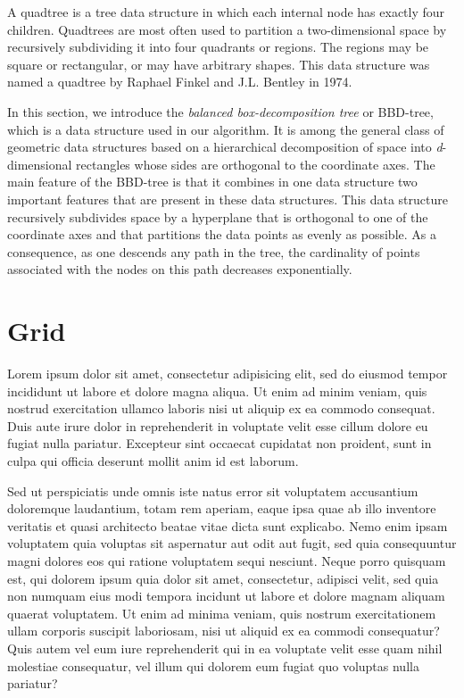 \documentclass[ijoc,nonblindrev]{informs3} %
\begin{document}
A quadtree is a tree data structure in which each internal node has exactly four children. 
Quadtrees are most often used to partition a two-dimensional space by recursively 
subdividing it into four quadrants or regions. 
The regions may be square or rectangular, or may have arbitrary shapes. 
This data structure was named a quadtree by Raphael Finkel and J.L. Bentley in 1974. 

In this section, we introduce the \textit{balanced box-decomposition tree} or BBD-tree,
which is a data structure used in our algorithm. 
It is among the general class of geometric data structures based on a hierarchical decomposition of space
into \textit{d}-dimensional rectangles whose sides are orthogonal to the coordinate axes.
The main feature of the BBD-tree is that it combines in one data structure two
important features that are present in these data structures.
This data structure recursively subdivides space by a hyperplane that is orthogonal to one
of the coordinate axes and that partitions the data points as evenly as possible.
As a consequence, as one descends any path in the tree, the cardinality of points
associated with the nodes on this path decreases exponentially.

\section{Grid}

Lorem ipsum dolor sit amet, consectetur adipisicing elit, sed do eiusmod
tempor incididunt ut labore et dolore magna aliqua. Ut enim ad minim
veniam, quis nostrud exercitation ullamco laboris nisi ut aliquip ex ea
commodo consequat. Duis aute irure dolor in reprehenderit in voluptate
velit esse cillum dolore eu fugiat nulla pariatur. Excepteur sint
occaecat cupidatat non proident, sunt in culpa qui officia deserunt
mollit anim id est laborum.

Sed ut perspiciatis unde omnis iste natus error sit voluptatem
accusantium doloremque laudantium, totam rem aperiam, eaque ipsa quae ab
illo inventore veritatis et quasi architecto beatae vitae dicta sunt
explicabo. Nemo enim ipsam voluptatem quia voluptas sit aspernatur aut
odit aut fugit, sed quia consequuntur magni dolores eos qui ratione
voluptatem sequi nesciunt. Neque porro quisquam est, qui dolorem ipsum
quia dolor sit amet, consectetur, adipisci velit, sed quia non numquam
eius modi tempora incidunt ut labore et dolore magnam aliquam quaerat
voluptatem. Ut enim ad minima veniam, quis nostrum exercitationem ullam
corporis suscipit laboriosam, nisi ut aliquid ex ea commodi consequatur?
Quis autem vel eum iure reprehenderit qui in ea voluptate velit esse
quam nihil molestiae consequatur, vel illum qui dolorem eum fugiat quo
voluptas nulla pariatur?
\end{document}
